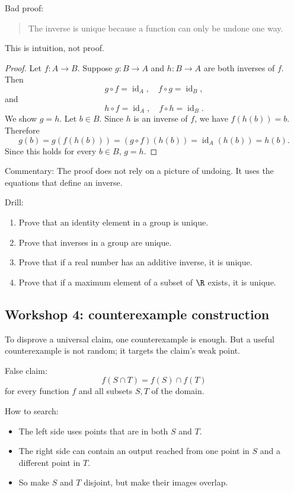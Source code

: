 Bad proof:

\begin{quote}
The inverse is unique because a function can only be undone one way.
\end{quote}

This is intuition, not proof.

\begin{proof}
Let $f:A\to B$. Suppose $g:B\to A$ and $h:B\to A$ are both inverses of $f$. Then
\[
g\circ f=\operatorname{id}_A,\quad f\circ g=\operatorname{id}_B,
\]
and
\[
h\circ f=\operatorname{id}_A,\quad f\circ h=\operatorname{id}_B.
\]
We show $g=h$. Let $b\in B$. Since $h$ is an inverse of $f$, we have $f(h(b))=b$. Therefore
\[
g(b)=g(f(h(b)))=(g\circ f)(h(b))=\operatorname{id}_A(h(b))=h(b).
\]
Since this holds for every $b\in B$, $g=h$.
\end{proof}

Commentary: The proof does not rely on a picture of undoing. It uses the equations that define an inverse.

Drill:

\begin{enumerate}
\item Prove that an identity element in a group is unique.
\item Prove that inverses in a group are unique.
\item Prove that if a real number has an additive inverse, it is unique.
\item Prove that if a maximum element of a subset of $\R$ exists, it is unique.
\end{enumerate}

\subsection{Workshop 4: counterexample construction}

To disprove a universal claim, one counterexample is enough. But a useful counterexample is not random; it targets the claim's weak point.

False claim:
\[
f(S\cap T)=f(S)\cap f(T)
\]
for every function $f$ and all subsets $S,T$ of the domain.

How to search:

\begin{itemize}
\item The left side uses points that are in both $S$ and $T$.
\item The right side can contain an output reached from one point in $S$ and a different point in $T$.
\item So make $S$ and $T$ disjoint, but make their images overlap.
\end{itemize}


